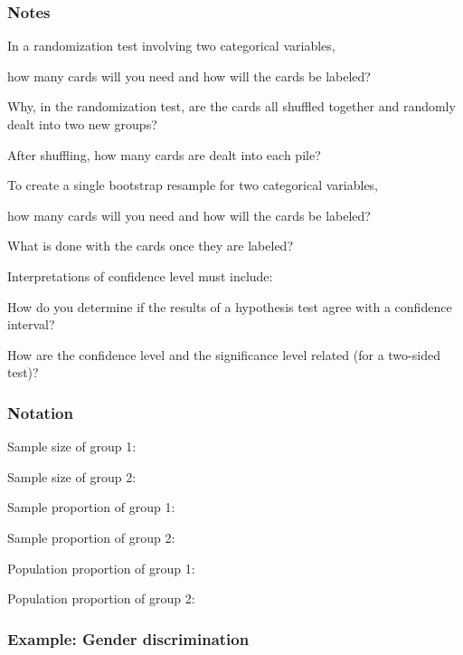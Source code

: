 \documentclass[
]{report}
\newcommand{\rgs}{\vspace{12pt}} %
\newcommand{\rgi}{\hspace{24pt}}  %
\begin{document}
\hypertarget{notes-20}{%
\subsubsection*{Notes}\label{notes-20}}

In a randomization test involving two categorical variables,

\rgi how many cards will you need and how will the cards be labeled?
\rgs

\rgi Why, in the randomization test, are the cards all shuffled together and randomly dealt into two new groups?
\rgs

\rgi After shuffling, how many cards are dealt into each pile?
\rgs

To create a single bootstrap resample for two categorical variables,

\rgi how many cards will you need and how will the cards be labeled?
\rgs

\rgi What is done with the cards once they are labeled?
\rgs

Interpretations of confidence level must include:
\rgs
\rgs

How do you determine if the results of a hypothesis test agree with a confidence interval?
\rgs
\rgs

How are the confidence level and the significance level related (for a two-sided test)?
\rgs

\hypertarget{notation}{%
\subsubsection*{Notation}\label{notation}}

Sample size of group 1:
\rgs

Sample size of group 2:
\rgs

Sample proportion of group 1:
\rgs

Sample proportion of group 2:
\rgs

Population proportion of group 1:
\rgs

Population proportion of group 2:
\rgs

\hypertarget{example-gender-discrimination}{%
\subsubsection*{Example: Gender discrimination}\label{example-gender-discrimination}}
\end{document}
